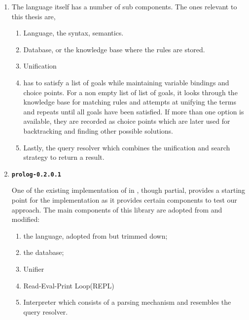 \documentclass[thesis-solanki.tex]{subfiles}
\providecommand\codeLibrary[1]{\texttt{\bfseries #1}}
\begin{document}
\begin{enumerate}
\item {}

The language itself has a number of sub components.
The ones relevant to this thesis are,
\begin{enumerate}
\item Language, the syntax, semantics.

\item Database, or the knowledge base where the rules are stored.

\item Unification

\item
   has to satisfy a list of goals while maintaining variable bindings and choice points.
  For a non empty list of list of goals, it looks through the knowledge base for matching rules and attempts at
  unifying the terms and repeats until all goals have been satisfied.
  If more than one option is available, they are recorded as choice points which are later used for backtracking
  and finding other possible solutions.

\item
  Lastly, the query resolver which combines the unification and search strategy to return a result.
\end{enumerate}

\item \codeLibrary{prolog-0.2.0.1} \cite{prolog-lib}

  One of the existing implementation of  in , though partial, provides a starting
  point for the implementation as it provides
  certain components to test
  our approach.
  The main components of this library are adopted from  and modified:

\begin{enumerate}
\item the language, adopted from  but trimmed down;

\item the database;

\item Unifier

\item Read-Eval-Print Loop(REPL)

\item Interpreter which consists of a parsing mechanism and resembles the query resolver.
\end{enumerate}


\end{enumerate}
\end{document}

